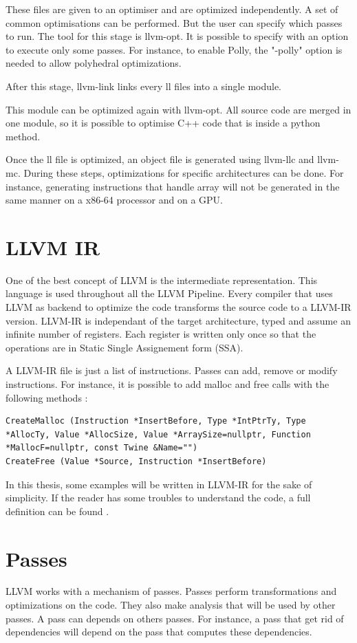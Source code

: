 These files are given to an optimiser and are optimized independently. A set of common optimisations can be performed. But the user can specify which passes to run. The tool for this stage is llvm-opt. It is possible to specify with an option to execute only some passes. For instance, to enable Polly, the "-polly" option is needed to allow polyhedral optimizations.

After this stage, llvm-link links every ll files into a single module.

This module can be optimized again with llvm-opt. All source code are merged in one module, so it is possible to optimise C++ code that is inside a python method. 

Once the ll file is optimized, an object file is generated using llvm-llc and llvm-mc. During these steps, optimizations for specific architectures can be done. For instance, generating instructions that handle array will not be generated in the same manner on a x86-64 processor and on a GPU.

\section{LLVM IR}
One of the best concept of LLVM is the intermediate representation. This language is used throughout all the LLVM Pipeline. Every compiler that uses LLVM as backend to optimize the code transforms the source code to a LLVM-IR version. LLVM-IR is independant of the target architecture, typed and assume an infinite number of registers. Each register is written only once so that the operations are in Static Single Assignement form (SSA). 

A LLVM-IR file is just a list of instructions. Passes can add, remove or modify instructions. For instance, it is possible to add malloc and free calls with the following methods :
\begin{lstlisting}[frame=single]
CreateMalloc (Instruction *InsertBefore, Type *IntPtrTy, Type *AllocTy, Value *AllocSize, Value *ArraySize=nullptr, Function *MallocF=nullptr, const Twine &Name="")
CreateFree (Value *Source, Instruction *InsertBefore)
\end{lstlisting}

In this thesis, some examples will be written in LLVM-IR for the sake of simplicity. If the reader has some troubles to understand the code, a full definition can be found .

\section{Passes}
LLVM works with a mechanism of passes. Passes perform transformations and optimizations on the code. They also make analysis that will be used by other passes. A pass can depends on others passes. For instance, a pass that get rid of dependencies will depend on the pass that computes these dependencies.


